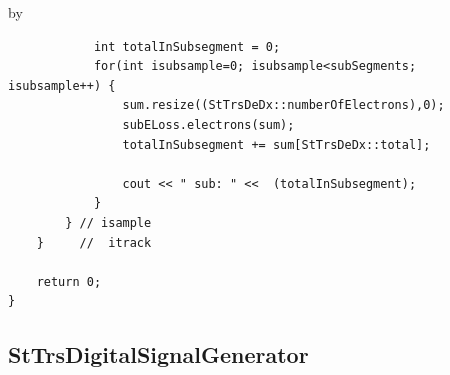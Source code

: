 \documentclass[twoside]{article}
\newcommand{\entrylabel}[1]{\mbox{\textbf{{#1}}}\hfil}%
\newenvironment{entry}
{\begin{list}{}%
    {\renewcommand{\makelabel}{\entrylabel}%
     \setlength{\labelwidth}{90pt}%
     \setlength{\leftmargin}{\labelwidth}
     \advance\leftmargin by \labelsep%
      }%
    }%
  {\end{list}}
\newcommand{\Entrylabel}[1]%
{\raisebox{0pt}[1ex][0pt]{\makebox[\labelwidth][l]%
    {\parbox[t]{\labelwidth}{\hspace{0pt}\textbf{{#1}}}}}}
\newenvironment{Entry}%
{\renewcommand{\entrylabel}{\Entrylabel}\begin{entry}}%
  {\end{entry}}
\begin{document}
\begin{Entry}
{\begin{verbatim}
            int totalInSubsegment = 0;
            for(int isubsample=0; isubsample<subSegments; isubsample++) {
                sum.resize((StTrsDeDx::numberOfElectrons),0);
                subELoss.electrons(sum);
                totalInSubsegment += sum[StTrsDeDx::total];

                cout << " sub: " <<  (totalInSubsegment);
            }
        } // isample
    }     //  itrack

    return 0;
}

\end{verbatim}
}%

\end{Entry}
\clearpage

%
%
\subsection{StTrsDigitalSignalGenerator} 
\label{sec:stTrsDigitalSignalGenerator}
\end{document}
